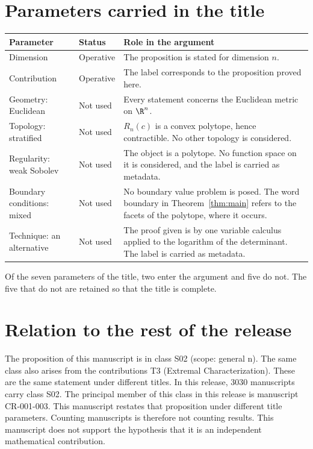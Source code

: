 \documentclass[11pt]{article}
\begin{document}
\section{Parameters carried in the title}\label{sec:params}
\begin{center}
\small
\begin{tabular}{p{}p{}p{}}
\toprule
Parameter & Status & Role in the argument \\
\midrule
Dimension & Operative & The proposition is stated for dimension $n$. \\
Contribution & Operative & The label corresponds to the proposition proved here. \\
Geometry: Euclidean & Not used & Every statement concerns the Euclidean metric on $\R^n$. \\
Topology: stratified & Not used & $R_n(c)$ is a convex polytope, hence contractible. No other topology is considered. \\
Regularity: weak Sobolev & Not used & The object is a polytope. No function space on it is considered, and the label is carried as metadata. \\
Boundary conditions: mixed & Not used & No boundary value problem is posed. The word boundary in Theorem~\ref{thm:main} refers to the facets of the polytope, where it occurs. \\
Technique: an alternative & Not used & The proof given is by one variable calculus applied to the logarithm of the determinant. The label is carried as metadata. \\
\bottomrule
\end{tabular}
\end{center}
Of the seven parameters of the title, two enter the argument and five do not. The five that do not are retained so that the title is complete.

\section{Relation to the rest of the release}
The proposition of this manuscript is in class S02 (scope: general n). The same class also arises from the contributions T3 (Extremal Characterization). These are the same statement under different titles.
In this release, 3030 manuscripts carry class S02. The principal member of this class in this release is manuscript CR-001-003. This manuscript restates that proposition under different title parameters.
Counting manuscripts is therefore not counting results. This manuscript does not support the hypothesis that it is an independent mathematical contribution.
\end{document}
